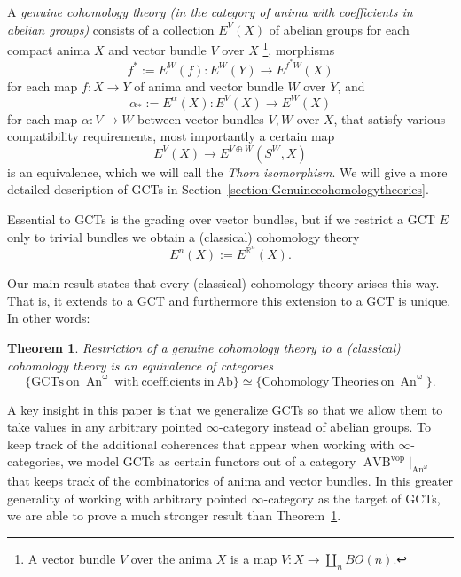 \documentclass{article}
\newcommand{\R}{\mathbb{R}} %
\newcommand{\vop}{\mathrm{vop}}
\DeclareMathOperator{\AVB}{AVB}
\DeclareMathOperator{\An}{An}
\newtheorem{theorem}{Theorem}
\begin{document}
A \emph{genuine cohomology theory (in the category of anima with coefficients in abelian groups)} 
consists of a collection $E^V(X)$ of abelian groups for each compact anima $X$ and vector bundle $V$ over $X$
\footnote{A vector bundle $V$ over the anima $X$ is a map $V \colon X \to \coprod_n BO(n)$.},
morphisms 
\[f^* := E^W(f) \colon E^W(Y) \to E^{f^*W}(X)\] for each map $f \colon X \to Y$ of anima and vector bundle $W$ over 
$Y$,
and 
\[\alpha_* := E^\alpha(X) \colon E^V(X) \to E^W(X)\] for each map $\alpha \colon V \to W$ between vector bundles $V,W$ over $X$, 
that satisfy various compatibility requirements, most importantly 
a certain map 
\[
E^V(X) \to E^{V \oplus W}(S^W,X)    
\]
is an equivalence, which we will call the \emph{Thom isomorphism}.
We will give a more detailed description of GCTs in Section~\ref{section:Genuinecohomologytheories}.

Essential to GCTs is the grading over vector bundles, but if we restrict a GCT $E$ only to trivial bundles 
we obtain a (classical) cohomology theory
\[
  E^n(X) := E^{\R^n}(X).  
\]

Our main result states that every (classical) cohomology theory arises this way.
That is, it extends to a GCT and furthermore this extension to a GCT is unique.
In other words:

\begin{theorem}\label{thm:introGCTs}Restriction of a genuine cohomology theory to a (classical) cohomology theory is 
    an equivalence of categories 
\[
\{\mathrm{GCTs\ on\ \An^\omega\ with\ coefficients\ in\ Ab}\} \simeq 
\{\mathrm{Cohomology\ Theories\ on\ \An^\omega}\}.\]
\end{theorem}

A key insight in this paper is that we generalize GCTs 
so that we allow them to take values in any arbitrary pointed $\infty$-category
instead of abelian groups.
To keep track of the additional coherences that appear when working with $\infty$-categories, we model 
GCTs as certain functors out of a category $\AVB^\vop|_{\An^\omega}$ that keeps track of the 
combinatorics of anima and vector bundles. 
In this greater generality of working with arbitrary pointed $\infty$-category as the target of GCTs, we are 
able to prove a much stronger result than Theorem~\ref{thm:introGCTs}.
\end{document}
